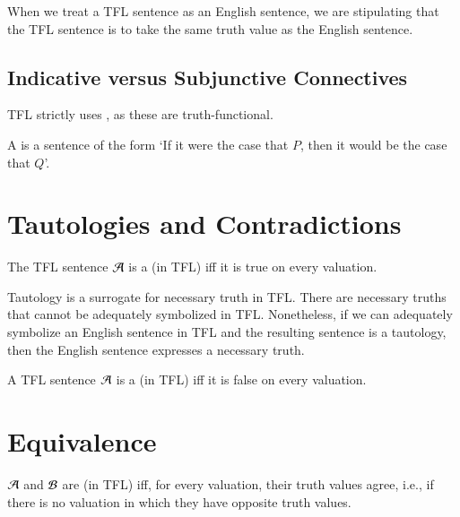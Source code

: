 \documentclass[12pt, a4paper, oneside, openright, titlepage]{book}
\begin{document}
\begin{defn}
    When we treat a TFL sentence as  an English sentence, we are stipulating that the TFL sentence is to take the same truth value as the English sentence.
\end{defn}

\subsection{\textsection Indicative versus Subjunctive Connectives}

\begin{defn}
    TFL strictly uses , as these are truth-functional.
\end{defn}


\begin{defn}
    A  is a sentence of the form `If it were the case that $P$, then it would be the case that $Q$'.
\end{defn}

\section{\textsection Tautologies and Contradictions}

\begin{defn}
    The TFL sentence $\mathcal{A}$ is a  (in TFL) iff it is true on every valuation.
\end{defn}

\begin{rmk}
    Tautology is a surrogate for necessary truth in TFL. There are necessary truths that cannot be adequately symbolized in TFL. Nonetheless, if we can adequately symbolize an English sentence in TFL and the resulting sentence is a tautology, then the English sentence expresses a necessary truth.
\end{rmk}


\begin{defn}
    A TFL sentence $\mathcal{A}$ is a  (in TFL) iff it is false on every valuation.
\end{defn}

\section{\textsection Equivalence}


\begin{defn}
    $\mathcal{A}$ and $\mathcal{B}$ are  (in TFL) iff, for every valuation, their truth values agree, i.e., if there is no valuation in which they have opposite truth values.
\end{defn}
\end{document}
